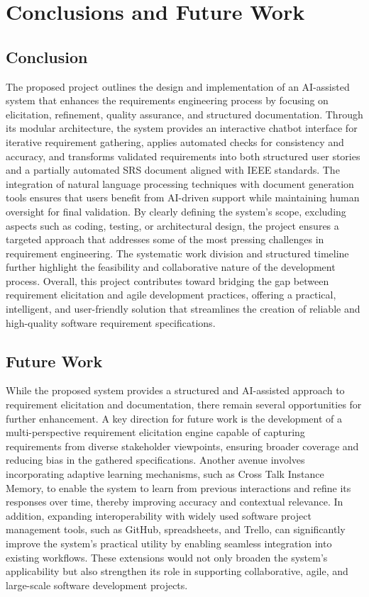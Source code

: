 \chapter{Conclusions and Future Work}

\section{Conclusion}
The proposed project outlines the design and implementation of an AI-assisted system that enhances the requirements engineering process by focusing on elicitation, refinement, quality assurance, and structured documentation.
Through its modular architecture, the system provides an interactive chatbot interface for iterative requirement gathering, applies automated checks for consistency and accuracy, and transforms validated requirements into both structured user stories and a partially automated SRS document aligned with IEEE standards. 
The integration of natural language processing techniques with document generation tools ensures that users benefit from AI-driven support while maintaining human oversight for final validation.
By clearly defining the system’s scope, excluding aspects such as coding, testing, or architectural design, the project ensures a targeted approach that addresses some of the most pressing challenges in requirement engineering. The systematic work division and structured timeline further highlight the feasibility and collaborative nature of the development process. 
Overall, this project contributes toward bridging the gap between requirement elicitation and agile development practices, offering a practical, intelligent, and user-friendly solution that streamlines the creation of reliable and high-quality software requirement specifications.

\section{Future Work}
While the proposed system provides a structured and AI-assisted approach to requirement elicitation and documentation, there remain several opportunities for further enhancement. A key direction for future work is the development of a multi-perspective requirement elicitation engine capable of capturing requirements from diverse stakeholder viewpoints, ensuring broader coverage and reducing bias in the gathered specifications. 
Another avenue involves incorporating adaptive learning mechanisms, such as Cross Talk Instance Memory, to enable the system to learn from previous interactions and refine its responses over time, thereby improving accuracy and contextual relevance.
In addition, expanding interoperability with widely used software project management tools, such as GitHub, spreadsheets, and Trello, can significantly improve the system’s practical utility by enabling seamless integration into existing workflows. These extensions would not only broaden the system’s applicability but also strengthen its role in supporting collaborative, agile, and large-scale software development projects.

